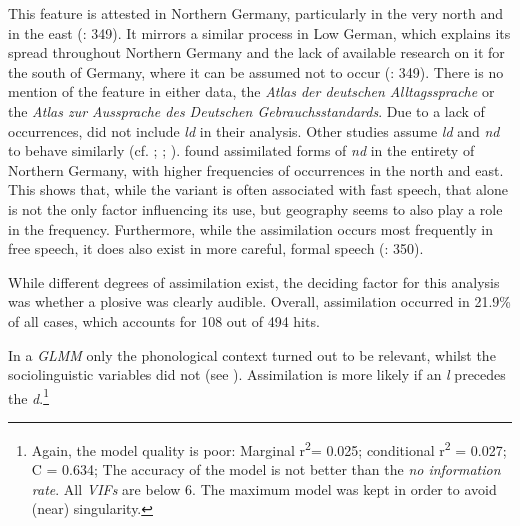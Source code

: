\documentclass[output=paper]{langsci/langscibook}
\begin{document}
 

This feature is attested in Northern Germany, particularly in the very north and in the east (\citealt{elmentaler_norddeutscher_2015}: 349). It mirrors a similar process in Low German, which explains its spread throughout Northern Germany and the lack of available research on it for the south of Germany, where it can be assumed not to occur (\citealt{elmentaler_norddeutscher_2015}: 349). There is no mention of the feature in either  data, the \textit{Atlas der deutschen Alltagssprache} or the \textit{Atlas zur Aussprache des Deutschen Gebrauchsstandards}. Due to a lack of occurrences,  \citet[349]{elmentaler_norddeutscher_2015} did not include \textit{ld} in their analysis. Other studies assume \textit{ld} and \textit{nd} to behave similarly (cf. \citealt{scheel_hamburger_1963}; \citealt{schonfeld_sprache_1989}; \citealt{mihm_sprachgeschichte_2000}).  \citet[349--350]{elmentaler_norddeutscher_2015} found assimilated forms of \textit{nd} in the entirety of Northern Germany, with higher frequencies of occurrences in the north and east. This shows that, while the variant is often associated with fast speech, that alone is not the only factor influencing its use, but geography seems to also play a role in the frequency. Furthermore, while the assimilation occurs most frequently in free speech, it does also exist in more careful, formal speech (\citealt{elmentaler_norddeutscher_2015}: 350).

While different degrees of assimilation exist, the deciding factor for this analysis was whether a plosive was clearly audible. Overall, assimilation occurred in 21.9\% of all cases, which accounts for 108 out of 494 hits.

In a \textit{GLMM} only the phonological context turned out to be relevant, whilst the sociolinguistic variables did not (see ). Assimilation is more likely if an \textit{l} precedes the \textit{d}.\footnote{Again, the model quality is poor: Marginal r\textsuperscript{2}= 0.025; conditional r\textsuperscript{2} = 0.027; C = 0.634; The accuracy of the model is not better than the \textit{no information rate}. All \textit{VIFs} are below 6. The maximum model was kept in order to avoid (near) singularity.} 
\end{document}
